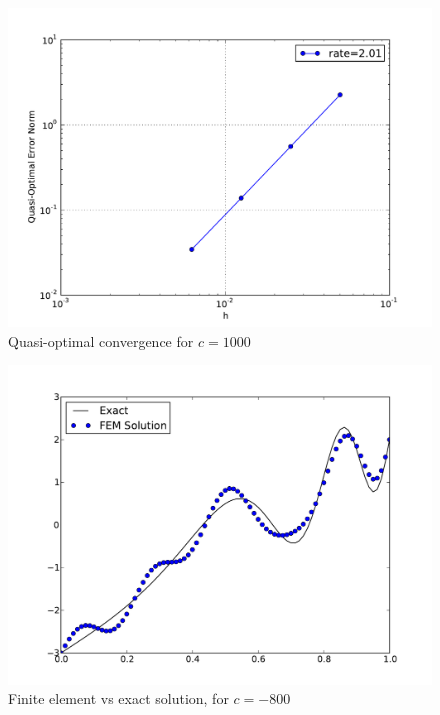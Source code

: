 \documentclass[10pt,letterpaper]{article}
\begin{document}
\begin{figure}[p]
\begin{center}
\includegraphics[width=5in]{epc1000.pdf}
\end{center}
\caption{Quasi-optimal convergence for $c=1000$}
\end{figure}

\begin{figure}[p]
\begin{center}
\includegraphics[width=5in]{c-800.pdf}
\end{center}
\caption{Finite element vs exact solution, for $c=-800$}
\label{fig:negsoln}
\end{figure}
\end{document}
